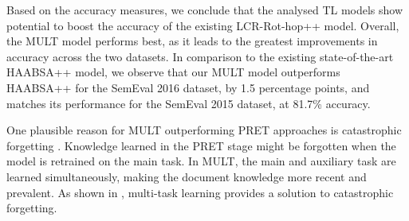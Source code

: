 \documentclass[runningheads]{llncs}
\begin{document}
Based on the accuracy measures, we conclude that the analysed TL models show potential to boost the accuracy of the existing LCR-Rot-hop++ model. Overall, the MULT model performs best, as it leads to the greatest improvements in accuracy across the two datasets. In comparison to the existing state-of-the-art HAABSA++ model, we observe that our MULT model outperforms HAABSA++ for the SemEval 2016 dataset, by 1.5 percentage points, and matches its performance for the SemEval 2015 dataset, at 81.7\% accuracy. 

One plausible reason for MULT outperforming PRET approaches is catastrophic forgetting \cite{Chen2020}. Knowledge learned in the PRET stage might be forgotten when the model is retrained on the main task. In MULT, the main and auxiliary task are learned simultaneously, making the document knowledge more recent and prevalent. As shown in \cite{Chen2020}, multi-task learning provides a solution to catastrophic forgetting.
\end{document}
